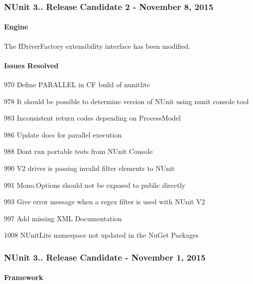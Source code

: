\subsubsection*{N\+Unit 3.. Release Candidate 2 -\/ November 8, 2015}

\paragraph*{Engine}


\begin{DoxyItemize}
\item The I\+Driver\+Factory extensibility interface has been modified.
\end{DoxyItemize}

\paragraph*{Issues Resolved}


\begin{DoxyItemize}
\item 970 Define P\+A\+R\+A\+L\+L\+EL in CF build of nunitlite
\item 978 It should be possible to determine version of N\+Unit using nunit console tool
\item 983 Inconsistent return codes depending on Process\+Model
\item 986 Update docs for parallel execution
\item 988 Don\textquotesingle{}t run portable tests from N\+Unit Console
\item 990 V2 driver is passing invalid filter elements to N\+Unit
\item 991 Mono.\+Options should not be exposed to public directly
\item 993 Give error message when a regex filter is used with N\+Unit V2
\item 997 Add missing X\+ML Documentation
\item 1008 N\+Unit\+Lite namespace not updated in the Nu\+Get Packages
\end{DoxyItemize}

\subsubsection*{N\+Unit 3.. Release Candidate -\/ November 1, 2015}

\paragraph*{Framework}


